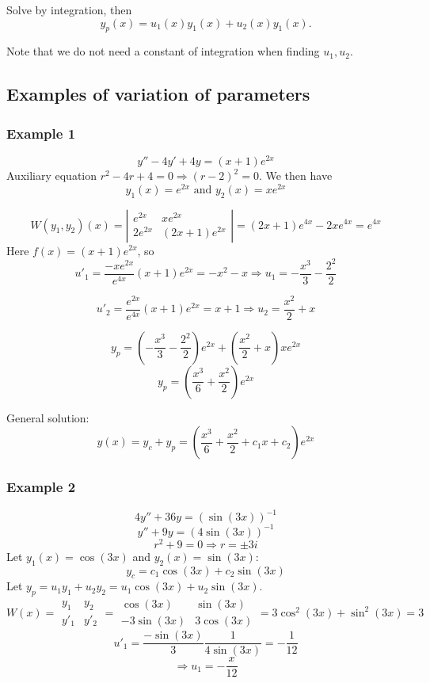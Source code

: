 \documentclass[11pt]{article}
\begin{document}
Solve by integration, then
	\[
		y_p (x) = u_1 (x) y_1 (x) + u_2 (x) y_1 (x).
	\]

Note that we do not need a constant of integration when finding $u_1, u_2$.

\subsection{Examples of variation of parameters}
\subsubsection{Example 1}
	$$ y'' - 4y' + 4y = (x+1) e^{2x} $$
	Auxiliary equation $r^2 - 4r + 4 = 0 \Rightarrow (r-2)^2 = 0$. We then have
		$$ y_1 (x) = e^{2x} \text{ and } y_2 (x) = xe^{2x} $$

		\[
			W(y_1,y_2)(x) =
				\left|
					\begin{array}{cc}
						e^{2x} & xe^{2x} \\
						2e^{2x} & (2x+1)e^{2x}
					\end{array}
				\right|
				= (2x + 1)e^{4x} - 2xe^{4x} = e^{4x}
		\]
	Here $f(x) = (x+1)e^{2x}$, so
		$$ u'_1 = \frac{-x e^{2x}}{e^{4x}} (x+1)e^{2x} = -x^2 - x \Rightarrow u_1 = -\frac{x^3}{3} - \frac{2^2}{2} $$

		$$ u'_2 = \frac{e^{2x}}{e^{4x}} (x+1)e^{2x} = x+1 \Rightarrow u_2 = \frac{x^2}{2} + x $$

		$$ y_p = \left(-\frac{x^3}{3} - \frac{2^2}{2}\right) e^{2x} + \left(\frac{x^2}{2} + x\right) x e^{2x} $$
		$$ y_p = \left(\frac{x^3}{6} + \frac{x^2}{2}\right)e^{2x} $$

	General solution:
		$$ y(x) = y_c + y_p = \left(\frac{x^3}{6} + \frac{x^2}{2} + c_1 x + c_2 \right) e^{2x} $$

\subsubsection{Example 2}
		$$ 4y'' + 36y = (\sin(3x))^{-1} $$
		$$ y'' + 9y = (4 \sin(3x))^{-1} $$
		$$ r^2 + 9 = 0 \Rightarrow r = \pm 3 i $$
	Let $y_1 (x) = \cos (3x)$ and $y_2 (x) = \sin (3x)$:
		$$ y_c = c_1 \cos (3x) + c_2 \sin (3x) $$
	Let $y_p = u_1 y_1 + u_2 y_2 = u_1 \cos(3x) + u_2 \sin (3x)$.
		$$ W(x) =
			\begin{array}{|cc|}
				y_1 & y_2 \\
				y'_1 & y'_2
			\end{array}
			=
			\begin{array}{|cc|}
				\cos(3x) & \sin(3x) \\
				-3 \sin(3x) & 3 \cos(3x)
			\end{array}
			= 3 \cos^2(3x) + \sin^2 (3x) = 3
		$$
		$$ u'_1 = \frac{- \sin (3x)}{3} \frac{1}{4 \sin (3x)} = - \frac{1}{12} $$
		$$ \Rightarrow u_1 = - \frac{x}{12} $$
\end{document}
